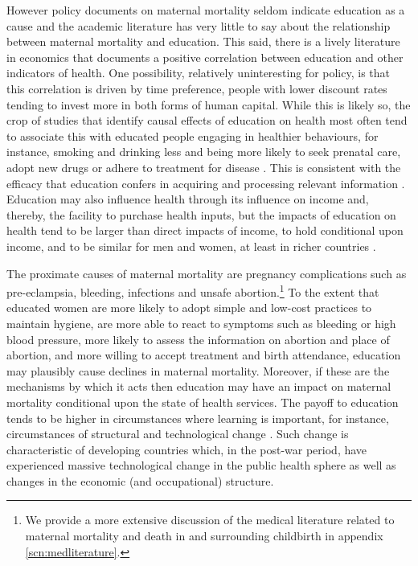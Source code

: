 \documentclass{article}[12pt,subeqn]
\begin{document}
\begin{spacing}{1.4}
However policy documents on maternal mortality seldom indicate education as a 
cause and the academic literature has very little to say about the relationship 
between maternal mortality and education. This said,
there is a lively literature in economics that documents a positive correlation 
between education and other indicators of health. One possibility, relatively 
uninteresting for policy, is that this correlation is driven by time preference, 
people with lower discount rates tending to invest more in both forms of human 
capital.  While this is likely so, the crop of studies that identify causal 
effects of education on health most often tend to associate this with educated 
people engaging in healthier behaviours, for instance, smoking and drinking
less and being more likely to seek prenatal care, adopt new drugs or adhere to 
treatment for disease \citep{GoldmanSmith2010, GoldmanLakdawalla2001, 
CurrieMoretti2003, LichtenburgLlerasMuney2005, CutlerLlerasMuney2010,
GliedLlerasMuney2010, JensenLlerasMuney2012}. This is consistent with the 
efficacy that education confers in acquiring and processing relevant information 
\citep{Rosenzweig1995, RosenzweigSchultz1989, CutlerLlerasMuney2010}. Education 
may also influence health through its influence on income and, thereby, the 
facility to purchase health inputs, but the impacts of education on health tend to 
be larger than direct impacts of income, to hold conditional upon income, and to 
be similar for men and women, at least in richer countries \citep{LlerasMuney2005, 
CutlerLlerasMuney2010}.

The proximate causes of maternal mortality are pregnancy complications such as 
pre-eclampsia, bleeding, infections and unsafe abortion.\footnote{We provide a
more extensive discussion of the medical literature related to maternal mortality
and death in and surrounding childbirth in appendix \ref{scn:medliterature}.} To 
the extent that educated women are more likely to adopt simple and low-cost 
practices to maintain hygiene, are more able to react to symptoms such as bleeding 
or high blood pressure, more likely to assess the information on abortion and place 
of abortion, and more willing to accept
treatment and birth attendance, education may plausibly cause declines in maternal 
mortality. Moreover, if these are the mechanisms by which it acts then education 
may have an impact on maternal mortality conditional upon the state of health 
services. The payoff to education tends to be higher in circumstances where 
learning is important, for instance, circumstances of structural and technological 
change \citep{FosterRosenzweig2004}. Such change is characteristic of developing 
countries which, in the post-war period, have experienced massive technological 
change in the public health sphere \citep{Cutleretal2006} as well as changes in 
the economic (and occupational) structure.


\end{spacing}
\end{document}

